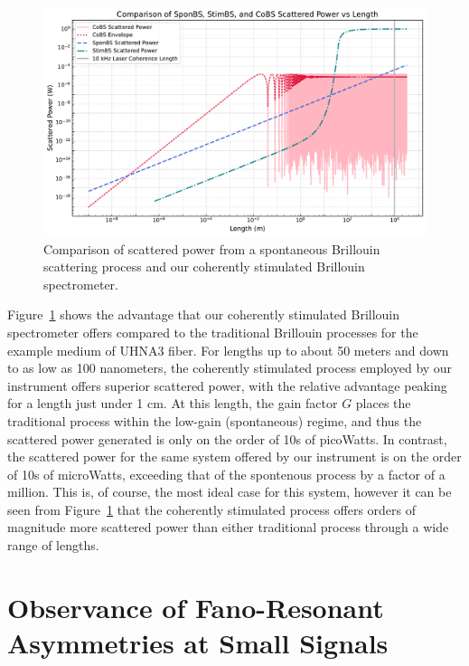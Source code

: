 \begin{figure}[ht]
\centering
\includegraphics[width=\textwidth]{figs/3-CoBS/SponBSvsStimBSvsCoBS.pdf}
\caption{Comparison of scattered power from a spontaneous Brillouin scattering process and our coherently stimulated Brillouin spectrometer.}
\label{fig:SponBSvsStimBSvsCoBS}
\end{figure}

Figure~\ref{fig:SponBSvsStimBSvsCoBS} shows the advantage that our coherently stimulated Brillouin spectrometer offers compared to the traditional Brillouin processes for the example medium of UHNA3 fiber. For lengths up to about 50 meters and down to as low as 100 nanometers, the coherently stimulated process employed by our instrument offers superior scattered power, with the relative advantage peaking for a length just under 1 cm. At this length, the gain factor $G$ places the traditional process within the low-gain (spontaneous) regime, and thus the scattered power generated is only on the order of 10s of picoWatts. In contrast, the scattered power for the same system offered by our instrument is on the order of 10s of microWatts, exceeding that of the spontenous process by a factor of a million. This is, of course, the most ideal case for this system, however it can be seen from Figure~\ref{fig:SponBSvsStimBSvsCoBS} that the coherently stimulated process offers orders of magnitude more scattered power than either traditional process through a wide range of lengths.

\newpage


\section{Observance of Fano-Resonant Asymmetries at Small Signals}
\label{Appendix:Fano}

